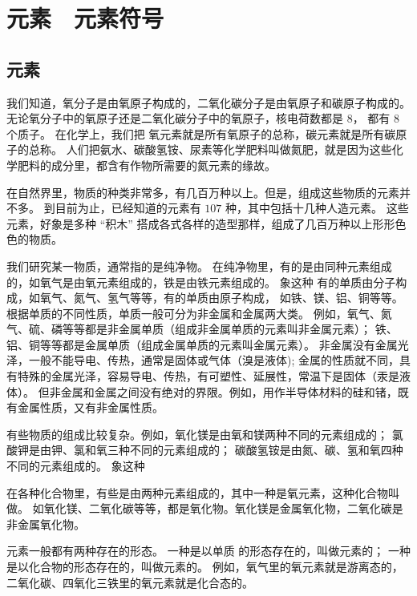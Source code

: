\section{元素　元素符号}\label{sec:1-6}

\subsection{元素}

我们知道，氧分子是由氧原子构成的，二氧化碳分子是由氧原子和碳原子构成的。
无论氧分子中的氧原子还是二氧化碳分子中的氧原子，核电荷数都是 $8$， 都有 $8$ 个质子。
在化学上，我们把
氧元素就是所有氧原子的总称，碳元素就是所有碳原子的总称。
人们把氨水、碳酸氢铵、尿素等化学肥料叫做氮肥，就是因为这些化学肥料的成分里，都含有作物所需要的氮元素的缘故。

在自然界里，物质的种类非常多，有几百万种以上。但是，组成这些物质的元素并不多。
到目前为止，已经知道的元素有 $107$ 种，其中包括十几种人造元素。
这些元素，好象是多种 “积木” 搭成各式各样的造型那样，组成了几百万种以上形形色色的物质。

我们研究某一物质，通常指的是纯净物。
在纯净物里，有的是由同种元素组成的，如氧气是由氧元素组成的，铁是由铁元素组成的。
象这种
有的单质由分子构成，如氧气、氮气、氢气等等，有的单质由原子构成， 如铁、镁、铝、铜等等。
根据单质的不同性质，单质一般可分为非金属和金属两大类。
例如，氧气、氮气、硫、磷等等都是非金属单质（组成非金属单质的元素叫非金属元素）；
铁、铝、铜等等都是金属单质（组成金属单质的元素叫金属元素）。
非金属没有金属光泽，一般不能导电、传热，通常是固体或气体（溴是液体);
金属的性质就不同，具有特殊的金属光泽，容易导电、传热，有可塑性、延展性，常温下是固体（汞是液体）。
但非金属和金属之间没有绝对的界限。例如，用作半导体材料的硅和锗，既有金属性质，又有非金属性质。

有些物质的组成比较复杂。例如，氧化镁是由氧和镁两种不同的元素组成的；
氯酸钾是由钾、氯和氧三种不同的元素组成的；
碳酸氢铵是由氮、碳、氢和氧四种不同的元素组成的。
象这种

在各种化合物里，有些是由两种元素组成的，其中一种是氧元素，这种化合物叫做。
如氧化镁、二氧化碳等等，都是氧化物。氧化镁是金属氧化物，二氧化碳是非金属氧化物。

元素一般都有两种存在的形态。
一种是以单质  的形态存在的，叫做元素的；
一种是以化合物的形态存在的，叫做元素的。
例如，氧气里的氧元素就是游离态的，二氧化碳、四氧化三铁里的氧元素就是化合态的。

